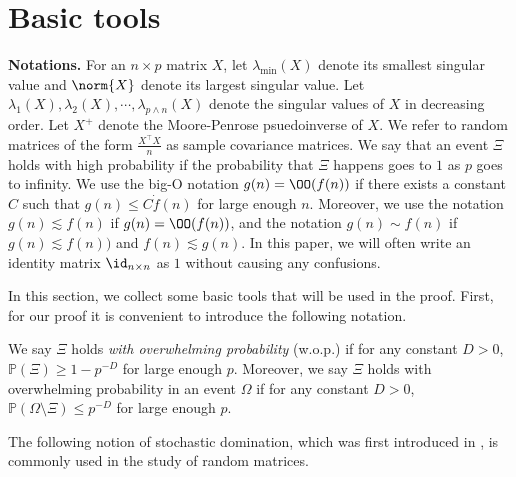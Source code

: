 \documentclass[aos,preprint]{imsart}
\begin{document}
\section{Basic tools}\label{app_tool}

\noindent\textbf{Notations.}
For an $n\times p$ matrix $X$, let $\lambda_{\min}(X)$ denote its smallest singular value and $\norm{X}$ denote its largest singular value.
Let $\lambda_1(X), \lambda_2(X), \cdots, \lambda_{p\wedge n}(X)$ denote the singular values of $X$ in decreasing order.
Let $X^+$ denote the Moore-Penrose psuedoinverse of $X$.
We refer to random matrices of the form $\frac {X^\top X} n$ as sample covariance matrices.
We say that an event $\Xi$ holds with high probability if the probability that $\Xi$ happens goes to $1$ as $p$ goes to infinity.
We use the big-O notation $g(n) = \OO(f(n))$ if there exists a constant $C$ such that $g(n) \le C \dot f(n)$ for large enough $n$. Moreover, we use the notation $g(n)\lesssim f(n)$ if $g(n) = \OO(f(n))$, and the notation $g(n)\sim f(n)$ if $g(n) \lesssim f(n))$ and $f(n) \lesssim g(n)$. In this paper, we will often write an identity matrix $\id_{n\times n}$ as $1$ without causing any confusions.


 In this section, we collect some basic tools that will be used in the proof.
First, for our proof it is convenient to introduce the following notation.
\begin{definition}
 We say $\Xi$ holds \emph{with overwhelming probability} (w.o.p.) if for any constant $D>0$, $\mathbb P(\Xi)\ge 1- p^{-D}$ for large enough $p$. Moreover, we say $\Xi$ holds with overwhelming probability in an event $\Omega$ if for any constant $D>0$, $\mathbb P(\Omega\setminus \Xi)\le p^{-D}$ for large enough $p$.
\end{definition}

The following notion of stochastic domination, which was first introduced in \cite{Average_fluc}, is commonly used in the study of random matrices.
\end{document}
